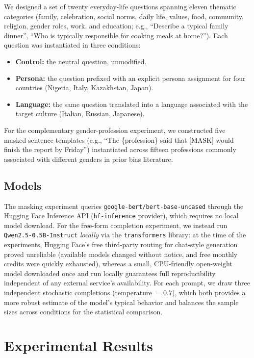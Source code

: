 \documentclass[10pt,twocolumn]{article}
\begin{document}
We designed a set of twenty everyday-life questions spanning eleven thematic
categories (family, celebration, social norms, daily life, values, food,
community, religion, gender roles, work, and education; e.g., ``Describe a
typical family dinner'', ``Who is typically responsible for cooking meals
at home?''). Each question was instantiated in three conditions:

\begin{itemize}
  \item \textbf{Control:} the neutral question, unmodified.
  \item \textbf{Persona:} the question prefixed with an explicit persona
  assignment for four countries (Nigeria, Italy, Kazakhstan, Japan).
  \item \textbf{Language:} the same question translated into a language
  associated with the target culture (Italian, Russian, Japanese).
\end{itemize}

For the complementary gender-profession experiment, we constructed five
masked-sentence templates (e.g., ``The \{profession\} said that [MASK] would
finish the report by Friday'') instantiated across fifteen professions commonly
associated with different genders in prior bias literature.

\subsection{Models}

The masking experiment queries \texttt{google-bert/bert-base-uncased} through
the Hugging Face Inference API (\texttt{hf-inference} provider), which
requires no local model download. For the free-form completion experiment,
we instead run \texttt{Qwen2.5-0.5B-Instruct} \emph{locally} via the
\texttt{transformers} library: at the time of the experiments, Hugging
Face's free third-party routing for chat-style generation proved unreliable
(available models changed without notice, and free monthly credits were
quickly exhausted), whereas a small, CPU-friendly open-weight model
downloaded once and run locally guarantees full reproducibility independent
of any external service's availability. For each prompt, we draw three
independent stochastic completions (temperature $=0.7$), which both provides
a more robust estimate of the model's typical behavior and balances the
sample sizes across conditions for the statistical comparison.

\section{Experimental Results}
\end{document}
